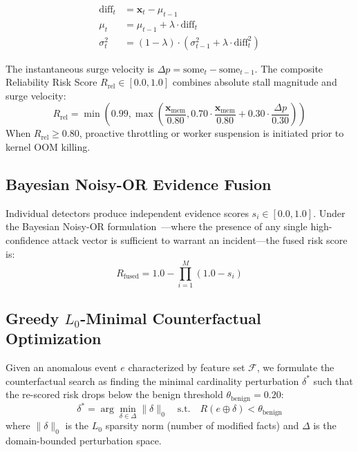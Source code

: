 \documentclass[conference]{IEEEtran}
\begin{document}
\begin{align}
\text{diff}_t &= \mathbf{x}_t - \mu_{t-1} \\
\mu_t &= \mu_{t-1} + \lambda \cdot \text{diff}_t \\
\sigma_t^2 &= (1 - \lambda) \cdot (\sigma_{t-1}^2 + \lambda \cdot \text{diff}_t^2)
\end{align}

The instantaneous surge velocity is $\Delta p = \text{some}_t - \text{some}_{t-1}$. The composite Reliability Risk Score $R_{\text{rel}} \in [0.0, 1.0]$ combines absolute stall magnitude and surge velocity:
\begin{equation}
R_{\text{rel}} = \min\left(0.99, \max\left(\frac{\mathbf{x}_{\text{mem}}}{0.80}, 0.70 \cdot \frac{\mathbf{x}_{\text{mem}}}{0.80} + 0.30 \cdot \frac{\Delta p}{0.30}\right)\right)
\end{equation}
When $R_{\text{rel}} \ge 0.80$, proactive throttling or worker suspension is initiated prior to kernel OOM killing.

\subsection{Bayesian Noisy-OR Evidence Fusion}
Individual detectors produce independent evidence scores $s_i \in [0.0, 1.0]$. Under the Bayesian Noisy-OR formulation~\cite{munoz2017bayesian}—where the presence of any single high-confidence attack vector is sufficient to warrant an incident—the fused risk score is:
\begin{equation}
R_{\text{fused}} = 1.0 - \prod_{i=1}^M (1.0 - s_i)
\end{equation}

\subsection{Greedy $L_0$-Minimal Counterfactual Optimization}
Given an anomalous event $e$ characterized by feature set $\mathcal{F}$, we formulate the counterfactual search as finding the minimal cardinality perturbation $\delta^*$ such that the re-scored risk drops below the benign threshold $\theta_{\text{benign}} = 0.20$:
\begin{equation}
\delta^* = \arg\min_{\delta \in \Delta} \|\delta\|_0 \quad \text{s.t.} \quad R(e \oplus \delta) < \theta_{\text{benign}}
\end{equation}
where $\|\delta\|_0$ is the $L_0$ sparsity norm (number of modified facts) and $\Delta$ is the domain-bounded perturbation space.
\end{document}

